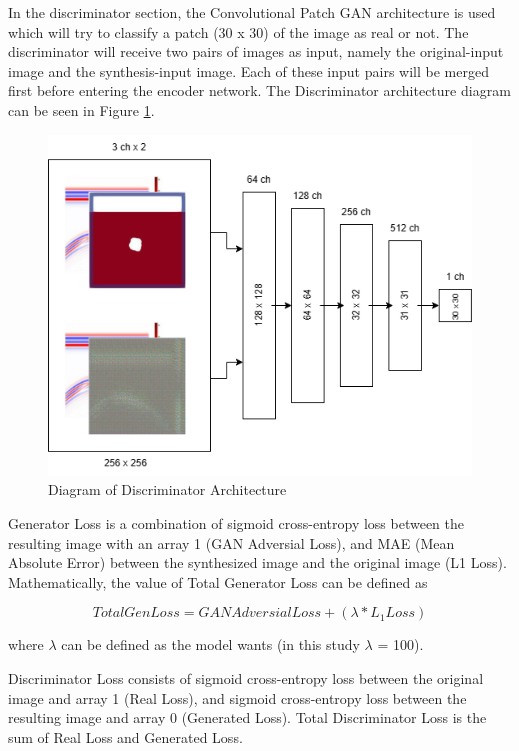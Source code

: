 \documentclass[conference]{IEEEtran}
\begin{document}
In the discriminator section, the Convolutional Patch GAN architecture is used which will try to classify a patch (30 x 30) of the image as real or not. 
The discriminator will receive two pairs of images as input, namely the original-input image and the synthesis-input image. 
Each of these input pairs will be merged first before entering the encoder network.
The Discriminator architecture diagram can be seen in Figure \ref{fig:discriminator}.

\begin{figure}[ht]
  \centering
  \includegraphics[scale=0.3]{gambar/Discriminator.png}
  \caption{Diagram of Discriminator Architecture}
  \label{fig:discriminator}
\end{figure}

Generator Loss is a combination of sigmoid cross-entropy loss between the resulting image with an array 1 (GAN Adversial Loss), and MAE (Mean Absolute Error) between the synthesized image and the original image (L1 Loss).
Mathematically, the value of Total Generator Loss can be defined as

\begin{equation}
  \label{eq:genLoss}
  Total Gen Loss = GAN Adversial Loss + (\lambda * L_{1} Loss) 
\end{equation}

where $\lambda$ can be defined as the model wants (in this study $\lambda$ = 100).

Discriminator Loss consists of sigmoid cross-entropy loss between the original image and array 1 (Real Loss), and sigmoid cross-entropy loss between the resulting image and array 0 (Generated Loss).
Total Discriminator Loss is the sum of Real Loss and Generated Loss.
\end{document}
